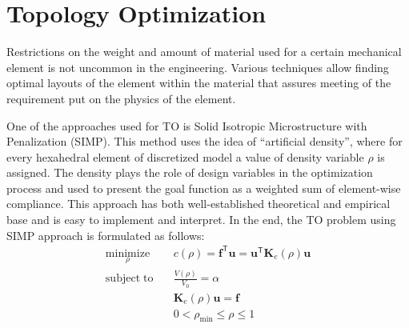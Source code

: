 
\label{chapter:Introduction}



\chapter{Topology Optimization}

Restrictions on the weight and amount of material used for a certain mechanical element is not uncommon in the engineering.
Various techniques allow finding optimal layouts of the element within the material that assures meeting of the requirement put on the physics of the element. 
\medskip

One of the approaches used for TO is Solid Isotropic Microstructure with Penalization (SIMP).
This method uses the idea of ``artificial density''\cite{to_simp}, where for every hexahedral element of discretized model a value of density variable $\rho$ is assigned.
The density plays the role of design variables in the optimization process and used to present the goal function as a weighted sum of element-wise compliance.
This approach has both well-established theoretical and empirical base and is easy to implement and interpret.
In the end, the TO problem using SIMP approach is formulated as follows:
\begin{align*}
	\underset{\rho}{\mathrm{minimize}} \quad & c(\rho) = \mathbf{f}^{\mathsf{T}} \mathbf{u} = \mathbf{u}^{\mathsf{T}} \mathbf{K}_{e}(\rho) \mathbf{u} \\
	\mathrm{subject \; to} \quad & \frac{V(\rho)}{V_{0}} = \alpha \\
	& \mathbf{K}_{e}(\rho) \mathbf{u} = \mathbf{f} \\
	& 0 < \rho_{\min} \leq \rho \leq 1
\end{align*} 

